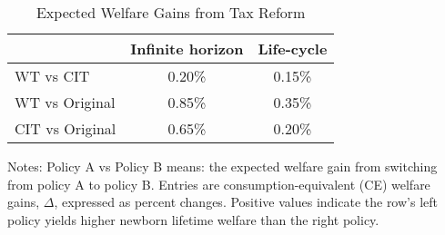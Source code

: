 \begin{table}[!htbp]
\centering
\caption{Expected Welfare Gains from Tax Reform}
\label{tab:ce_welfare_tax}
\begin{threeparttable}
\begin{tabular}{lcc}
\toprule
& \textbf{Infinite horizon} & \textbf{Life-cycle} \\
\midrule
WT vs CIT       & 0.20\% & 0.15\% \\
WT vs Original  & 0.85\% & 0.35\% \\
CIT vs Original & 0.65\% & 0.20\% \\
\bottomrule
\end{tabular}
\begin{tablenotes}[flushleft]
\footnotesize
\item Notes: Policy A vs Policy B means: the expected welfare gain from switching from policy A to policy B. Entries are consumption-equivalent (CE) welfare gains, $\Delta$, expressed as percent changes. Positive values indicate the row’s left policy yields higher newborn lifetime welfare than the right policy. 
\end{tablenotes}
\end{threeparttable}
\end{table}
